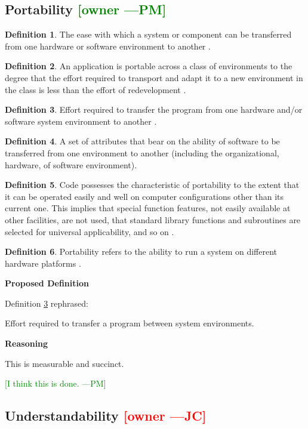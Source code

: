 \documentclass[letterpaper,cleveref]{lipics-v2019}
\newcommand{\authornote}[3]{\textcolor{#1}{[#3 ---#2]}}
\newcommand{\authornote}[3]{}
\newcommand{\jc}[1]{\authornote{red}{JC}{#1}} %
\newcommand{\pmi}[1]{\authornote{green}{PM}{#1}} %
\theoremstyle{definition}
\newtheorem{defn}{Definition}
\begin{document}
\subsection{Portability \pmi{owner}}
\begin{defn}
The ease with which a system or component can be transferred from one hardware
or software environment to another \citep{IEEEStdGlossarySET1990}.
\end{defn}
\begin{defn}
An application is portable across a class of environments to the degree that the
effort required to transport and adapt it to a new environment in the class is
less than the effort of redevelopment \citep{mooney1990strategies}.
\end{defn}
\begin{defn} \label{PortabilityDefnSelected}
Effort required to transfer the program from one hardware and/or software system
environment to another \citep{pressman2005software}.
\end{defn}
\begin{defn}
A set of attributes that bear on the ability of software to be transferred from
one environment to another (including the organizational, hardware, of software
environment)\citep{pfleeger2006software}.
\end{defn}
\begin{defn}
Code possesses the characteristic of portability to the extent that it can be
operated easily and well on computer configurations other than its current
one. This implies that special function features, not easily available at other
facilities, are not used, that standard library functions and subroutines are
selected for universal applicability, and so on \citep{boehm2007software}.
\end{defn}
\begin{defn}
Portability refers to the ability to run a system on different hardware
platforms \citep{ghezzi1991fundamentals}.
\end{defn}

\noindent \textbf{Proposed Definition}

Definition \ref{PortabilityDefnSelected} rephrased:

Effort required to transfer a program between system environments.

\noindent \textbf{Reasoning}

This is measurable and succinct. 

\pmi{I think this is done.}

\subsection{Understandability \jc{owner}}
\end{document}
